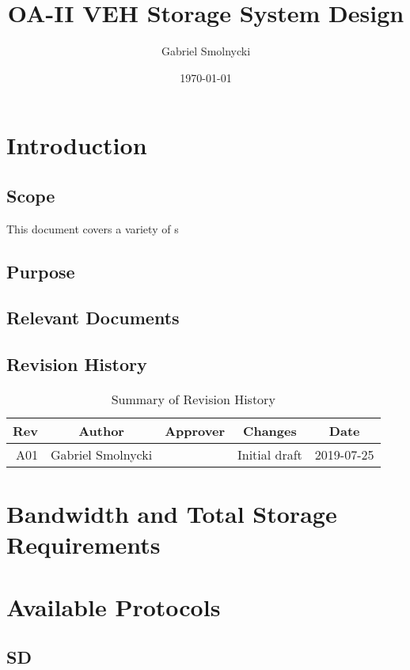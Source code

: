 \documentclass[12pt,article]{memoir}
\title{OA-II VEH Storage System Design}
\author{Gabriel Smolnycki}
\date{\today}
\begin{document}
	


\tableofcontents*
\clearpage


\chapter{Introduction}
\section{Scope}
This document covers a variety of s

\section{Purpose}

\section{Relevant Documents}

\section{Revision History}
\begin{table}[H]
	\centering
	\begin{tabu}{r || c | c | c | c }
		Rev & Author & Approver & Changes & Date\\ \hline
		A01 & Gabriel Smolnycki & & Initial draft & 2019-07-25 \\
	\end{tabu}
	\caption{Summary of Revision History}
	\label{tab:rev}
\end{table}

\newpage

\chapter{Bandwidth and Total Storage Requirements}

\newpage

\chapter{Available Protocols}
\section{SD}
\end{document}
